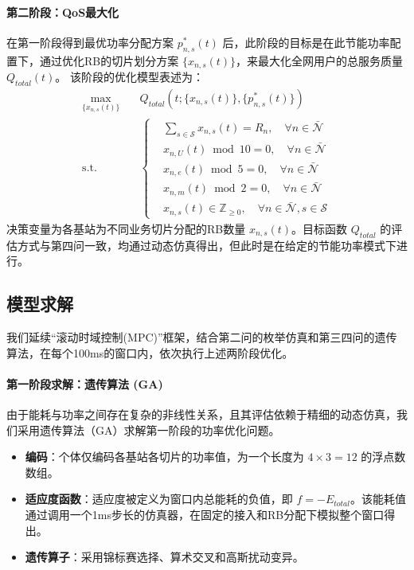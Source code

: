 \paragraph{第二阶段：QoS最大化}
在第一阶段得到最优功率分配方案 $p^*_{n,s}(t)$ 后，此阶段的目标是在此节能功率配置下，通过优化RB的切片划分方案 $\{x_{n,s}(t)\}$，来最大化全网用户的总服务质量 $Q_{total}(t)$。
该阶段的优化模型表述为：
\begin{equation}
\begin{aligned}
\max_{\{x_{n,s}(t)\}} \quad & Q_{total}\left(t; \{x_{n,s}(t)\}, \{p^*_{n,s}(t)\}\right) \\
\text{s.t.} \quad & 
\left\{
\begin{aligned}
& \sum_{s\in\mathcal{S}} x_{n,s}(t) = R_n, \quad \forall n \in \bar{\mathcal{N}} \\
& x_{n,U}(t)\bmod 10=0, \quad \forall n \in \bar{\mathcal{N}} \\
& x_{n,e}(t)\bmod 5=0, \quad \forall n \in \bar{\mathcal{N}} \\
& x_{n,m}(t)\bmod 2=0, \quad \forall n \in \bar{\mathcal{N}} \\
& x_{n,s}(t)\in\mathbb{Z}_{\ge 0}, \quad \forall n \in \bar{\mathcal{N}}, s \in \mathcal{S}
\end{aligned}
\right.
\end{aligned}
\end{equation}
决策变量为各基站为不同业务切片分配的RB数量 $x_{n,s}(t)$。目标函数 $Q_{total}$ 的评估方式与第四问一致，均通过动态仿真得出，但此时是在给定的节能功率模式下进行。

\subsection{模型求解}

我们延续“滚动时域控制(MPC)”框架，结合第二问的枚举仿真和第三四问的遗传算法，在每个100ms的窗口内，依次执行上述两阶段优化。

\paragraph{第一阶段求解：遗传算法 (GA)}
由于能耗与功率之间存在复杂的非线性关系，且其评估依赖于精细的动态仿真，我们采用遗传算法（GA）求解第一阶段的功率优化问题。
\begin{itemize}
    \item \textbf{编码}：个体仅编码各基站各切片的功率值，为一个长度为 $4 \times 3 = 12$ 的浮点数数组。
    \item \textbf{适应度函数}：适应度被定义为窗口内总能耗的负值，即 $f = -E_{total}$。该能耗值通过调用一个1ms步长的仿真器，在固定的接入和RB分配下模拟整个窗口得出。
    \item \textbf{遗传算子}：采用锦标赛选择、算术交叉和高斯扰动变异。
\end{itemize}


